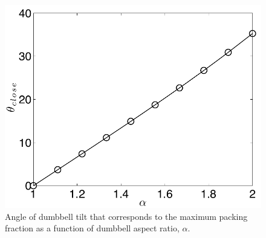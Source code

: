 \begin{figure}[htbp]
\centering
\includegraphics[width=1.0\textwidth]{figures/CsuppFigure8.pdf}
\caption{\label{fig:tilt-angle}
  	Angle of dumbbell tilt that corresponds to the maximum packing fraction as a function of dumbbell aspect ratio, $\alpha$.}
\end{figure}

